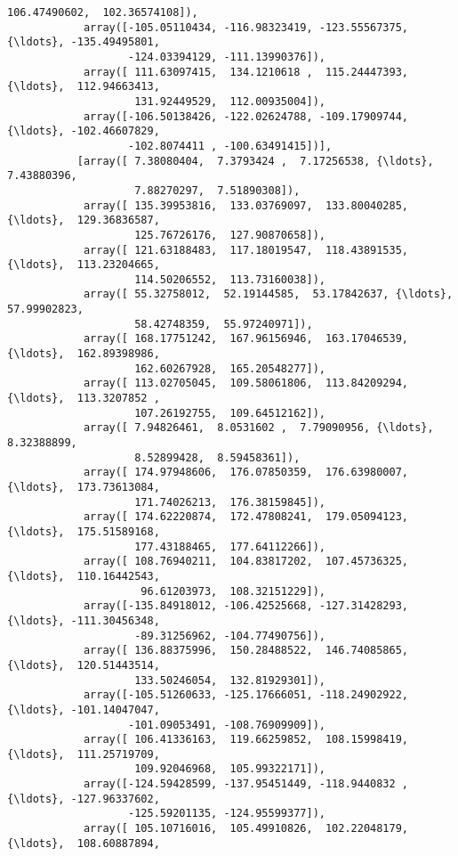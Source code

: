 \documentclass[11pt]{article}
\begin{document}
\begin{Verbatim}[commandchars=\\\{\}]
                    106.47490602,  102.36574108]),
            array([-105.05110434, -116.98323419, -123.55567375, {\ldots}, -135.49495801,
                   -124.03394129, -111.13990376]),
            array([ 111.63097415,  134.1210618 ,  115.24447393, {\ldots},  112.94663413,
                    131.92449529,  112.00935004]),
            array([-106.50138426, -122.02624788, -109.17909744, {\ldots}, -102.46607829,
                   -102.8074411 , -100.63491415])],
           [array([ 7.38080404,  7.3793424 ,  7.17256538, {\ldots},  7.43880396,
                    7.88270297,  7.51890308]),
            array([ 135.39953816,  133.03769097,  133.80040285, {\ldots},  129.36836587,
                    125.76726176,  127.90870658]),
            array([ 121.63188483,  117.18019547,  118.43891535, {\ldots},  113.23204665,
                    114.50206552,  113.73160038]),
            array([ 55.32758012,  52.19144585,  53.17842637, {\ldots},  57.99902823,
                    58.42748359,  55.97240971]),
            array([ 168.17751242,  167.96156946,  163.17046539, {\ldots},  162.89398986,
                    162.60267928,  165.20548277]),
            array([ 113.02705045,  109.58061806,  113.84209294, {\ldots},  113.3207852 ,
                    107.26192755,  109.64512162]),
            array([ 7.94826461,  8.0531602 ,  7.79090956, {\ldots},  8.32388899,
                    8.52899428,  8.59458361]),
            array([ 174.97948606,  176.07850359,  176.63980007, {\ldots},  173.73613084,
                    171.74026213,  176.38159845]),
            array([ 174.62220874,  172.47808241,  179.05094123, {\ldots},  175.51589168,
                    177.43188465,  177.64112266]),
            array([ 108.76940211,  104.83817202,  107.45736325, {\ldots},  110.16442543,
                     96.61203973,  108.32151229]),
            array([-135.84918012, -106.42525668, -127.31428293, {\ldots}, -111.30456348,
                    -89.31256962, -104.77490756]),
            array([ 136.88375996,  150.28488522,  146.74085865, {\ldots},  120.51443514,
                    133.50246054,  132.81929301]),
            array([-105.51260633, -125.17666051, -118.24902922, {\ldots}, -101.14047047,
                   -101.09053491, -108.76909909]),
            array([ 106.41336163,  119.66259852,  108.15998419, {\ldots},  111.25719709,
                    109.92046968,  105.99322171]),
            array([-124.59428599, -137.95451449, -118.9440832 , {\ldots}, -127.96337602,
                   -125.59201135, -124.95599377]),
            array([ 105.10716016,  105.49910826,  102.22048179, {\ldots},  108.60887894,

\end{Verbatim}
\end{document}

